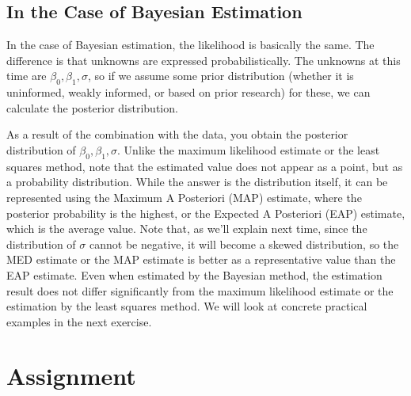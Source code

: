 \documentclass{ltjsarticle}
\begin{document}
\subsection{In the Case of Bayesian Estimation}
In the case of Bayesian estimation, the likelihood is basically the same. The difference is that unknowns are expressed probabilistically. The unknowns at this time are $\beta_0, \beta_1, \sigma$, so if we assume some prior distribution (whether it is uninformed, weakly informed, or based on prior research) for these, we can calculate the posterior distribution.

As a result of the combination with the data, you obtain the posterior distribution of $\beta_0, \beta_1, \sigma$. Unlike the maximum likelihood estimate or the least squares method, note that the estimated value does not appear as a point, but as a probability distribution. While the answer is the distribution itself, it can be represented using the Maximum A Posteriori (MAP) estimate, where the posterior probability is the highest, or the Expected A Posteriori (EAP) estimate, which is the average value. Note that, as we'll explain next time, since the distribution of $\sigma$ cannot be negative, it will become a skewed distribution, so the MED estimate or the MAP estimate is better as a representative value than the EAP estimate. Even when estimated by the Bayesian method, the estimation result does not differ significantly from the maximum likelihood estimate or the estimation by the least squares method. We will look at concrete practical examples in the next exercise.

\section{Assignment}
\end{document}
